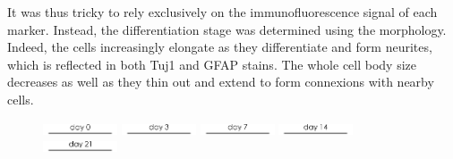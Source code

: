 \documentclass[onecolumn,10pt]{asme2ej}
\begin{document}

It was thus tricky to rely exclusively on the immunofluorescence signal of each marker. Instead, the differentiation stage was determined using the morphology. Indeed, the cells increasingly elongate as they differentiate and form neurites, which is reflected in both Tuj1 and GFAP stains. The whole cell body size decreases as well as they thin out and extend to form connexions with nearby cells.


\newpage
\begin{figure}[h]
	\includegraphics[width=0.196\textwidth]{figures/IF/charac(light)/d0}
	\includegraphics[width=0.196\textwidth]{figures/IF/charac(light)/d3}
	\includegraphics[width=0.196\textwidth]{figures/IF/charac(light)/d7}
	\includegraphics[width=0.196\textwidth]{figures/IF/charac(light)/d14}
	\includegraphics[width=0.196\textwidth]{figures/IF/charac(light)/d21}
	

\end{figure}
\end{document}
